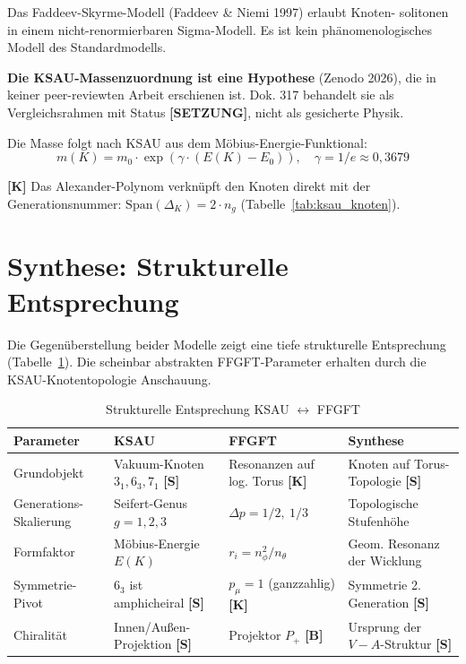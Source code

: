 Das Faddeev-Skyrme-Modell (Faddeev \& Niemi 1997) erlaubt Knoten-
solitonen in einem nicht-renormierbaren Sigma-Modell. Es ist kein
phänomenologisches Modell des Standardmodells.

\textbf{Die KSAU-Massenzuordnung ist eine Hypothese} (Zenodo 2026),
die in keiner peer-reviewten Arbeit erschienen ist. Dok. 317 behandelt
sie als Vergleichsrahmen mit Status \textbf{[SETZUNG]}, nicht als
gesicherte Physik.

Die Masse folgt nach KSAU aus dem Möbius-Energie-Funktional:
\begin{equation}
  m(K) = m_0 \cdot \exp(\gamma \cdot (E(K) - E_0)),
  \quad \gamma = 1/e \approx 0{,}3679
\end{equation}

\textbf{[K]} Das Alexander-Polynom verknüpft den Knoten direkt mit der
Generationsnummer: $\text{Span}(\Delta_K) = 2 \cdot n_g$
(Tabelle~\ref{tab:ksau_knoten}).

\section{Synthese: Strukturelle Entsprechung}

Die Gegenüberstellung beider Modelle zeigt eine tiefe strukturelle
Entsprechung (Tabelle~\ref{tab:synthese}). Die scheinbar abstrakten
FFGFT-Parameter erhalten durch die KSAU-Knotentopologie Anschauung.

\begin{table}[h]
\centering
\caption{Strukturelle Entsprechung KSAU $\leftrightarrow$ FFGFT}
\label{tab:synthese}
\begin{tabular}{llll}
\toprule
Parameter & KSAU & FFGFT & Synthese \\
\midrule
Grundobjekt
  & Vakuum-Knoten $3_1, 6_3, 7_1$ \textbf{[S]}
  & Resonanzen auf log. Torus \textbf{[K]}
  & Knoten auf Torus-Topologie \textbf{[S]} \\
Generations-Skalierung
  & Seifert-Genus $g = 1,2,3$
  & $\Delta p = 1/2,\ 1/3$
  & Topologische Stufenhöhe \\
Formfaktor
  & Möbius-Energie $E(K)$
  & $r_i = n_\phi^2/n_\theta$
  & Geom. Resonanz der Wicklung \\
Symmetrie-Pivot
  & $6_3$ ist amphicheiral \textbf{[S]}
  & $p_\mu = 1$ (ganzzahlig) \textbf{[K]}
  & Symmetrie 2. Generation \textbf{[S]} \\
Chiralität
  & Innen/Außen-Projektion \textbf{[S]}
  & Projektor $P_+$ \textbf{[B]}
  & Ursprung der $V{-}A$-Struktur \textbf{[S]} \\
\bottomrule
\end{tabular}
\end{table}

